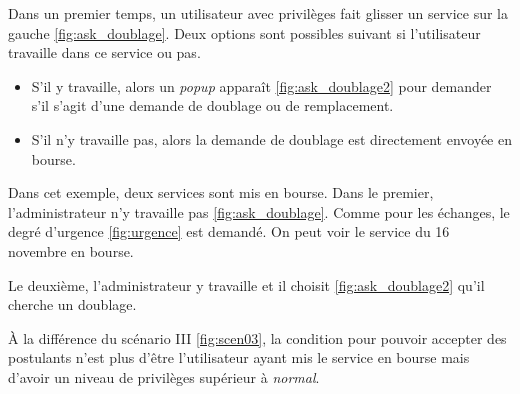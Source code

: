         Dans un premier temps, un utilisateur avec privilèges fait glisser un service 
        sur la gauche \ref{fig:ask_doublage}. Deux options sont possibles suivant si l'utilisateur travaille dans ce
        service ou pas.
        \smallskip
        \begin{itemize}
            \item S'il y travaille, alors un \textit{popup} apparaît \ref{fig:ask_doublage2} pour demander s'il s'agit d'une demande de doublage ou de remplacement.
            \item S'il n'y travaille pas, alors la demande de doublage est directement envoyée en bourse.
        \end{itemize}
        \medskip
        Dans cet exemple, deux services sont mis en bourse. 
        Dans le premier, l'administrateur n'y travaille pas \ref{fig:ask_doublage}. Comme pour les échanges, le degré d'urgence \ref{fig:urgence} est demandé. On peut voir le service du 16 novembre en bourse. 
        
        Le deuxième, l'administrateur y travaille et il choisit \ref{fig:ask_doublage2} qu'il cherche un doublage.

        À la différence du scénario III \ref{fig:scen03}, la condition pour pouvoir
        accepter des postulants n'est plus d'être l'utilisateur ayant mis le service en bourse
        mais d'avoir un niveau de privilèges supérieur à \textit{normal}.
        
        




